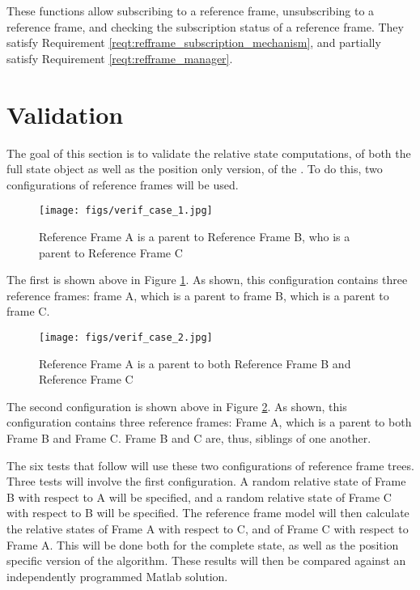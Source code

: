 These functions allow subscribing to a reference frame, unsubscribing to a reference frame, and
checking the subscription status of a reference frame. They satisfy
Requirement \ref{reqt:refframe_subscription_mechanism}, and partially satisfy
Requirement \ref{reqt:refframe_manager}.

\section{Validation}

The goal of this section is to validate the relative state computations, of both
the full state object as well as the position only version, of the
. To do this, two configurations of reference frames will be used.

\begin{figure}[H]
\begin{center}
\texttt{[image: figs/verif\_case\_1.jpg]}
\caption{Reference Frame A is a parent to Reference Frame B, who is a parent to
Reference Frame C}
\label{fig:verif_config_1}
\end{center}
\end{figure}

The first is shown above in Figure \ref{fig:verif_config_1}. As shown, this
configuration contains three reference frames: frame A, which is a parent to
frame B, which is a parent to frame C.

\begin{figure}[H]
\begin{center}
\texttt{[image: figs/verif\_case\_2.jpg]}
\caption{Reference Frame A is a parent to both Reference Frame B and
Reference Frame C}
\label{fig:verif_config_2}
\end{center}
\end{figure}

The second configuration is shown above in Figure \ref{fig:verif_config_2}.
As shown, this configuration contains three reference frames: Frame A, which
is a parent to both Frame B and Frame C. Frame B and C are, thus, siblings
of one another.

The six tests that follow will use these two configurations of reference
frame trees. Three tests will involve the first configuration. A random relative
state of Frame B with respect to A will be specified, and a random relative state
of Frame C with respect to B will be specified. The reference frame model will
then calculate the relative states of Frame A with respect to C, and of Frame
C with respect to Frame A. This will be done both for the complete state, as well
as the position specific version of the algorithm. These results will then
be compared against an independently programmed Matlab solution.

